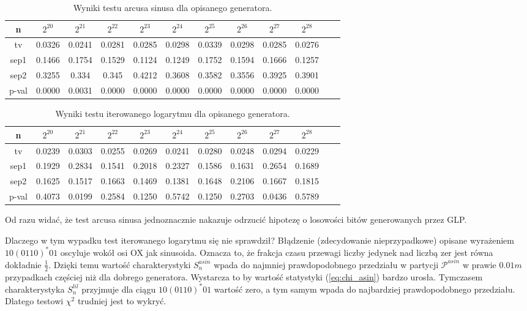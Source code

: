 \documentclass[a4paper,11pt,twoside]{book}
\newcommand{\Slil}[1]{S^{lil}_#1}
\newcommand{\Sasin}[1]{S^{asin}_#1}
\theoremstyle{definition}
\begin{document}
\begin{table}[ht!]
\centering
 \caption{Wyniki testu arcusa sinusa dla opisanego generatora.}
 \label{tab:zep_asin}
\begin{tabular} {||c|c|c|c|c|c|c|c|c|c|c|c||}  
 \hline
     n  &  $2^{20}$ &  $2^{21}$ &  $2^{22}$ &  $2^{23}$ &  $2^{24}$ &  $2^{25}$ &  $2^{26}$ &  $2^{27}$ &  $2^{28}$\\ \hline
     tv &  0.0326 &  0.0241 &  0.0281 &  0.0285 &  0.0298 &  0.0339 &  0.0298 &  0.0285 &  0.0276\\ \hline
   sep1 &  0.1466 &  0.1754 &  0.1529 &  0.1124 &  0.1249 &  0.1752 &  0.1594 &  0.1666 &  0.1257\\ \hline
   sep2 &  0.3255 &   0.334 &   0.345 &  0.4212 &  0.3608 &  0.3582 &  0.3556 &  0.3925 &  0.3901\\ \hline
  p-val &  0.0000 &  0.0031 &  0.0000 &  0.0000 &  0.0000 &  0.0000 &  0.0000 &  0.0000 &  0.0000\\ \hline
\end{tabular}  
\end{table}
\begin{table}[ht!]
\centering
 \caption{Wyniki testu iterowanego logarytmu dla opisanego generatora.}
 \label{tab:zep_lil}
\begin{tabular} {||c|c|c|c|c|c|c|c|c|c|c|c||}  
 \hline 
     n  &  $2^{20}$ &  $2^{21}$ &  $2^{22}$ &  $2^{23}$ &  $2^{24}$ &  $2^{25}$ &  $2^{26}$ &  $2^{27}$ &  $2^{28}$\\ \hline
     tv &  0.0239 &  0.0303 &  0.0255 &  0.0269 &  0.0241 &  0.0280 &  0.0248 &  0.0294 &  0.0229\\ \hline
   sep1 &  0.1929 &  0.2834 &  0.1541 &  0.2018 &  0.2327 &  0.1586 &  0.1631 &  0.2654 &  0.1689\\ \hline
   sep2 &  0.1625 &  0.1517 &  0.1663 &  0.1469 &  0.1381 &  0.1648 &  0.2106 &  0.1667 &  0.1815\\ \hline
  p-val &  0.4073 &  0.0199 &  0.2584 &  0.1250 &  0.5742 &  0.1250 &  0.2703 &  0.0436 &  0.5789\\ \hline
\end{tabular}  
\end{table}
Od razu widać, że test arcusa sinusa jednoznacznie nakazuje odrzucić hipotezę o losowości bitów generowanych przez GLP.

Dlaczego w tym wypadku test iterowanego logarytmu się nie sprawdził? Błądzenie (zdecydowanie nieprzypadkowe) opisane wyrażeniem $10(0110)^*01$ oscyluje wokół osi OX jak sinusoida. Oznacza to, że frakcja czasu przewagi liczby jedynek nad liczbą zer jest równa dokładnie $\frac{1}{2}$. Dzięki temu wartość charakterystyki $\Sasin{n}$ wpada do najmniej prawdopodobnego przedziału w partycji $\mathcal{P}^{asin}$ w prawie $0.01m$ przypadkach częściej niż dla dobrego generatora. Wystarcza to by wartość statystyki (\ref{eq:chi_asin}) bardzo urosła. Tymczasem charakterystyka $\Slil{n}$ przyjmuje dla ciągu $10(0110)^*01$ wartość zero, a tym samym wpada do najbardziej prawdopodobnego przedziału. Dlatego testowi $\chi^2$ trudniej jest to wykryć.
\end{document}
